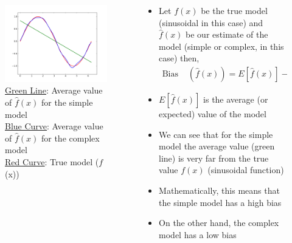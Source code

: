 \begin{frame}
	\begin{columns}
		\begin{column}{0.4\textwidth}
			\begin{figure}
				\justifying
				\includegraphics[width=0.9\linewidth]{images/combine}
				\caption{\underline{Green Line}: Average value of $\hat{f}(x)$ for the simple model\\
					\underline{Blue Curve}: Average value of $\hat{f}(x)$ for the complex model\\  
					\underline{Red Curve}: True model ($f$(x))}
				\label{fig:combine}
			\end{figure}
								
							
		\end{column}
					
		\begin{column}{0.6\textwidth}
			\begin{itemize}
				\justifying 						
				\setlength\itemsep{1em}
				\item<1-> Let $f(x)$ be the true model (sinusoidal in this case) and $\hat{f}(x)$ be our estimate of the model (simple or complex, in this case) then,
				\begin{align*}
					\text{Bias } & (\hat{f}(x))=E[\hat{f}(x)]-f(x) &   
				\end{align*}
				\item<2->$E[\hat{f}(x)]$ is the average (or expected) value of the model
									
				\item<3-> We can see that for the simple model the average value (green line) is very far from the true value $f(x)$ (sinusoidal function)
				\item<4-> Mathematically, this means that the simple model has a high bias
				\item<5-> On the other hand, the complex model has a low bias
			\end{itemize}
		\end{column}
	\end{columns}
\end{frame}
